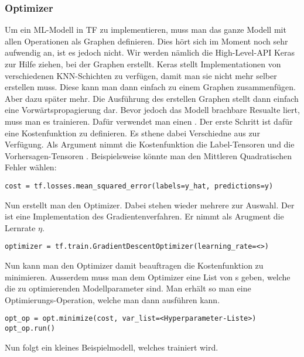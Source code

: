 \subsubsection{Optimizer}
Um ein ML-Modell in TF zu implementieren, muss man das ganze Modell mit
allen Operationen als Graphen definieren. Dies hört sich im Moment noch sehr
aufwendig an, ist es jedoch nicht. Wir werden nämlich die High-Level-API Keras
zur Hilfe ziehen, bei der Graphen erstellt.
Keras stellt Implementationen von verschiedenen KNN-Schichten zu verfügen, damit man sie nicht mehr selber
erstellen muss. Diese kann man dann einfach zu einem Graphen zusammenfügen.
Aber dazu später mehr.
\para{}
Die Ausführung des erstellen Graphen stellt dann einfach eine
Vorwärtspropagierung dar. Bevor jedoch das Modell brachbare Resualte liert,
muss man es trainieren. Dafür verwendet man einen .
\para{}
Der erste Schritt ist dafür eine Kostenfunktion zu definieren. Es sthene dabei
Verschiedne aus  zur Verfügung. Als Argument nimmt die
Kostenfunktion die Label-Tensoren  und die Vorhersagen-Tensoren .
Beispielsweise könnte man den Mittleren Quadratischen Fehler wählen:
\begin{verbatim}
cost = tf.losses.mean_squared_error(labels=y_hat, predictions=y)
\end{verbatim}
Nun erstellt man den Optimizer. Dabei stehen wieder mehrere zur Auswahl. Der
 ist eine Implementation des
Gradientenverfahren. Er nimmt als Arugment die Lernrate $\eta$.
\begin{verbatim}
optimizer = tf.train.GradientDescentOptimizer(learning_rate=<>)
\end{verbatim}
Nun kann man den Optimizer damit beauftragen die Kostenfunktion  zu
minimieren. Ausserdem muss man dem Optimizer eine List von s
geben, welche die zu optimierenden Modellparameter sind.
Man erhält so man eine Optimierungs-Operation, welche man dann
ausführen kann.
\begin{verbatim}
opt_op = opt.minimize(cost, var_list=<Hyperparameter-Liste>)
opt_op.run()
\end{verbatim}
\para{}
Nun folgt ein kleines Beispielmodell, welches trainiert wird.
